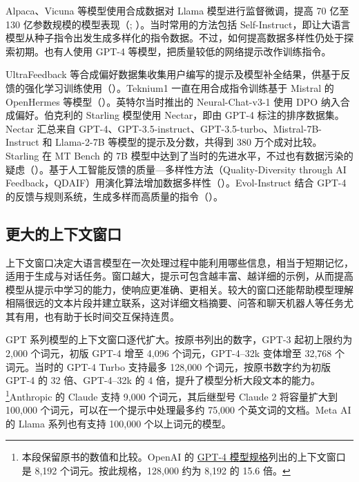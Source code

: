 Alpaca、Vicuna 等模型使用合成数据对 Llama 模型进行监督微调，提高 70 亿至 130 亿参数规模的模型表现（; ）。当时常用的方法包括 Self-Instruct，即让大语言模型从种子指令出发生成多样化的指令数据。不过，如何提高数据多样性仍处于探索初期。也有人使用 GPT-4 等模型，把质量较低的网络提示改作训练指令。

UltraFeedback 等合成偏好数据集收集用户编写的提示及模型补全结果，供基于反馈的强化学习训练使用（）。Teknium1 一直在用合成指令训练基于 Mistral 的 OpenHermes 等模型（）。英特尔当时推出的 Neural-Chat-v3-1 使用 DPO 纳入合成偏好。伯克利的 Starling 模型使用 Nectar，即由 GPT-4 标注的排序数据集。Nectar 汇总来自 GPT-4、GPT-3.5-instruct、GPT-3.5-turbo、Mistral-7B-Instruct 和 Llama-2-7B 等模型的提示及分数，共得到 380 万个成对比较。Starling 在 MT Bench 的 7B 模型中达到了当时的先进水平，不过也有数据污染的疑虑（）。基于人工智能反馈的质量—多样性方法（Quality-Diversity through AI Feedback，QDAIF）用演化算法增加数据多样性（）。Evol-Instruct 结合 GPT-4 的反馈与规则系统，生成多样而高质量的指令（）。

\subsection{更大的上下文窗口}
\label{sec:ch10-long-context}
上下文窗口决定大语言模型在一次处理过程中能利用哪些信息，相当于短期记忆，适用于生成与对话任务。窗口越大，提示可包含越丰富、越详细的示例，从而提高模型从提示中学习的能力，使响应更准确、更相关。较大的窗口还能帮助模型理解相隔很远的文本片段并建立联系，这对详细文档摘要、问答和聊天机器人等任务尤其有用，也有助于长时间交互保持连贯。

GPT 系列模型的上下文窗口逐代扩大。按原书列出的数字，GPT-3 起初上限约为 2,000 个词元，初版 GPT-4 增至 4,096 个词元，GPT-4–32k 变体增至 32,768 个词元。当时的 GPT-4 Turbo 支持最多 128,000 个词元，按原书数字约为初版 GPT-4 的 32 倍、GPT-4–32k 的 4 倍，提升了模型分析大段文本的能力。\footnote{本段保留原书的数值和比较。OpenAI 的 \href{https://developers.openai.com/api/docs/models/gpt-4}{GPT-4 模型规格}列出的上下文窗口是 8,192 个词元。按此规格，128,000 约为 8,192 的 15.6 倍。}Anthropic 的 Claude 支持 9,000 个词元，其后继型号 Claude 2 将容量扩大到 100,000 个词元，可以在一个提示中处理最多约 75,000 个英文词的文档。Meta AI 的 Llama 系列也有支持 100,000 个以上词元的模型。

